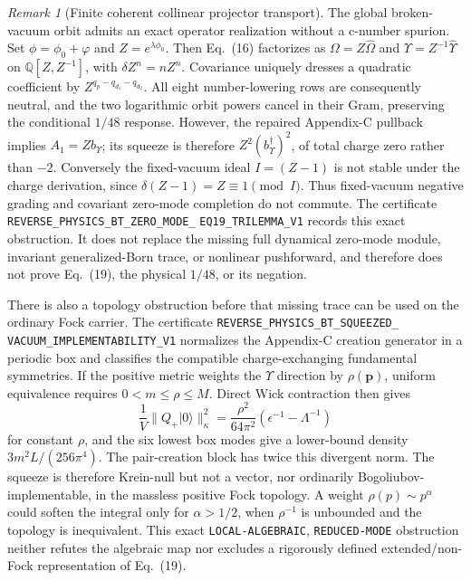 \documentclass[11pt]{article}
\theoremstyle{definition}
\theoremstyle{remark}
\newtheorem{remark}[theorem]{Remark}
\begin{document}
\begin{remark}[Finite coherent collinear projector transport]
The global broken-vacuum orbit admits an exact operator realization without a
c-number
spurion.  Set $\phi=\phi_0+\varphi$ and $Z=e^{\lambda\phi_0}$.  Then Eq.~(16)
factorizes as $\Omega=Z\widehat\Omega$ and
$\Upsilon=Z^{-1}\widehat\Upsilon$ on
$\mathbb Q[Z,Z^{-1}]$, with $\delta Z^n=nZ^n$.  Covariance uniquely dresses a
quadratic coefficient by $Z^{q_p-q_{d_1}-q_{d_2}}$.  All eight
number-lowering rows are consequently neutral, and the two logarithmic orbit
powers cancel in their Gram, preserving the conditional $1/48$ response.
However, the repaired Appendix-C pullback implies
$A_1=Zb_\Upsilon$; its squeeze is therefore
$Z^2(b_\Upsilon^\dagger)^2$, of total charge zero rather than $-2$.
Conversely the fixed-vacuum ideal $I=(Z-1)$ is not stable under the charge
derivation, since $\delta(Z-1)=Z\equiv1\pmod I$.  Thus fixed-vacuum negative
grading and covariant zero-mode completion do not commute.  The certificate
\texttt{REVERSE\_PHYSICS\_BT\_ZERO\_MODE\_}
\allowbreak\texttt{EQ19\_TRILEMMA\_V1} records this exact obstruction.  It
does not replace the missing full dynamical zero-mode module, invariant
generalized-Born trace, or nonlinear pushforward, and therefore does not prove
Eq.~(19), the physical $1/48$, or its negation.

There is also a topology obstruction before that missing trace can be used on
the ordinary Fock carrier.  The certificate
\texttt{REVERSE\_PHYSICS\_BT\_SQUEEZED\_}
\allowbreak\texttt{VACUUM\_IMPLEMENTABILITY\_V1} normalizes the Appendix-C
creation generator in a periodic box and classifies the compatible
charge-exchanging fundamental symmetries.  If the positive metric weights the
$\Upsilon$ direction by $\rho(\mathbf p)$, uniform equivalence requires
$0<m\leq\rho\leq M$.  Direct Wick contraction then gives
\[
 \frac1V\|Q_+|0\rangle\|_\kappa^2
 =\frac{\rho^2}{64\pi^2}
 \left(\epsilon^{-1}-\Lambda^{-1}\right)
\]
for constant $\rho$, and the six lowest box modes give a lower-bound density
$3m^2L/(256\pi^4)$.  The pair-creation block has twice this divergent norm.
The squeeze is therefore Krein-null but not a vector, nor ordinarily
Bogoliubov-implementable, in the massless positive Fock topology.  A weight
$\rho(p)\sim p^\alpha$ could soften the integral only for $\alpha>1/2$, when
$\rho^{-1}$ is unbounded and the topology is inequivalent.  This exact
\texttt{LOCAL-ALGEBRAIC}, \texttt{REDUCED-MODE} obstruction neither refutes
the algebraic map nor excludes a rigorously defined extended/non-Fock
representation of Eq.~(19).


\end{remark}
\end{document}
